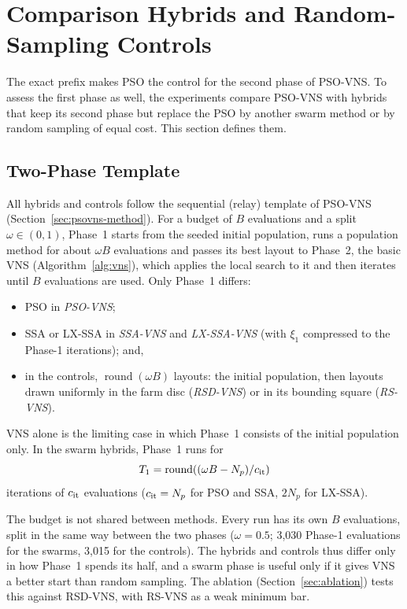 \section{Comparison Hybrids and Random-Sampling Controls}
\label{sec:hybrid}
The exact prefix makes PSO the control for the second phase of PSO-VNS. To assess the first phase as well, the experiments compare PSO-VNS with hybrids that keep its second phase but replace the PSO by another swarm method or by random sampling of equal cost. This section defines them.

\subsection{Two-Phase Template}
\label{sec:template}
All hybrids and controls follow the sequential (relay) template of PSO-VNS (Section~\ref{sec:psovns-method}). For a budget of $B$ evaluations and a split $\omega\in(0,1)$, Phase~1 starts from the seeded initial population, runs a population method for about $\omega B$ evaluations and passes its best layout to Phase~2, the basic VNS (Algorithm~\ref{alg:vns}), which applies the local search to it and then iterates until $B$ evaluations are used. Only Phase~1 differs:
\begin{itemize}
\item PSO in \emph{PSO-VNS};
\item SSA or LX-SSA in \emph{SSA-VNS} and \emph{LX-SSA-VNS} (with $\xi_1$ compressed to the Phase-1 iterations); and,
\item in the controls, $\operatorname{round}(\omega B)$ layouts: the initial population, then layouts drawn uniformly in the farm disc (\emph{RSD-VNS}) or in its bounding square (\emph{RS-VNS}).
\end{itemize}
VNS alone is the limiting case in which Phase~1 consists of the initial population only. In the swarm hybrids, Phase~1 runs for
\begin{equation*}
T_1=\operatorname{round}((\omega B-N_p)/c_{\rm it})
\end{equation*}
iterations of $c_{\rm it}$ evaluations ($c_{\rm it}=N_p$ for PSO and SSA, $2N_p$ for LX-SSA).

The budget is not shared between methods. Every run has its own $B$ evaluations, split in the same way between the two phases ($\omega=0.5$; 3,030 Phase-1 evaluations for the swarms, 3,015 for the controls). The hybrids and controls thus differ only in how Phase~1 spends its half, and a swarm phase is useful only if it gives VNS a better start than random sampling. The ablation (Section~\ref{sec:ablation}) tests this against RSD-VNS, with RS-VNS as a weak minimum bar.

